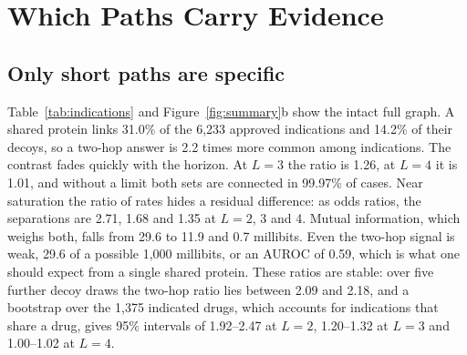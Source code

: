 \section{Which Paths Carry Evidence}
\label{sec:specificity}

\subsection{Only short paths are specific}
\label{sec:specificity-intact}

Table~\ref{tab:indications} and Figure~\ref{fig:summary}b show the intact full
graph. A shared protein links 31.0\% of the 6,233 approved indications and
14.2\% of their decoys, so a two-hop answer is 2.2 times more common among
indications. The contrast fades quickly with the horizon. At $L=3$ the ratio is
1.26, at $L=4$ it is 1.01, and without a limit both sets are connected in
99.97\% of cases. Near saturation the ratio of rates hides a residual difference: as odds
ratios, the separations are 2.71, 1.68 and 1.35 at $L=2$, 3 and 4. Mutual
information, which weighs both, falls from 29.6 to 11.9 and 0.7 millibits. Even
the two-hop signal is weak, 29.6 of a possible 1,000 millibits, or an AUROC of
0.59, which is what one should expect from a single shared protein. These ratios
are stable: over five further decoy draws the
two-hop ratio lies between 2.09 and 2.18, and a bootstrap over the 1,375
indicated drugs, which accounts for indications that share a drug, gives 95\%
intervals of 1.92--2.47 at $L=2$, 1.20--1.32 at $L=3$ and 1.00--1.02 at $L=4$.

\begin{table}[!htbp]
\centering
\small
\caption{Typed retrieval of 6,233 approved indications and 6,233
degree-preserving decoys on the intact full graph, with the chance rates of
Section~\ref{sec:theory-chance}: the configuration model with a Poisson
approximation (Eq.~\eqref{eq:cm}) and the bundled null model
(Eq.~\eqref{eq:ball}), evaluated for the decoy and the indication pairs.
Information is per pair, for a balanced mixture.}
\label{tab:indications}
\end{table}

